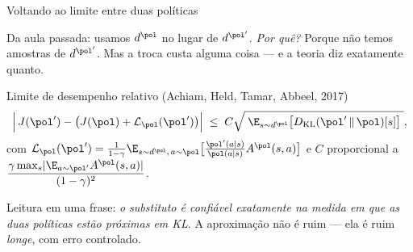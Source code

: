 \documentclass[aspectratio=169, 10pt]{beamer}
\newcommand{\polnovo}{\pol'}
\newcommand{\Advpi}{A^{\pol}}
\newcommand{\Dkl}{D_{\mathrm{KL}}}
\newcommand{\dpi}{d^{\pol}}
\newcommand{\Lsub}[1]{\mathcal{L}_{#1}}
\begin{document}
\begin{frame}{Voltando ao limite entre duas políticas}

  Da aula passada: usamos $\dpi$ no lugar de $d^{\polnovo}$. \emph{Por quê?}
  Porque não temos amostras de $d^{\polnovo}$. Mas a troca custa alguma coisa ---
  e a teoria diz exatamente quanto.

  \begin{teobox}{Limite de desempenho relativo (Achiam, Held, Tamar, Abbeel, 2017)}
    \[
      \Bigl\lvert\, J(\polnovo) - \bigl(J(\pol) + \Lsub{\pol}(\polnovo)\bigr) \Bigr\rvert
      \;\le\; C \sqrt{\;\E_{s\sim \dpi}\bigl[\Dkl(\polnovo \,\|\, \pol)[s]\bigr]\;},
    \]
    com $\Lsub{\pol}(\polnovo) = \frac{1}{1-\gamma}
      \E_{s\sim\dpi,\,a\sim\pol}\bigl[\frac{\polnovo(a\mid s)}{\pol(a\mid s)}\Advpi(s,a)\bigr]$
    e $C$ proporcional a $\dfrac{\gamma \max_s\lvert\E_{a\sim\polnovo}\Advpi(s,a)\rvert}{(1-\gamma)^2}$.
  \end{teobox}

  \begin{ideiabox}
    Leitura em uma frase: \emph{o substituto é confiável exatamente na medida em que
    as duas políticas estão próximas em KL}. A aproximação não é ruim --- ela é
    ruim \emph{longe}, com erro controlado.
  \end{ideiabox}
\end{frame}
\end{document}
